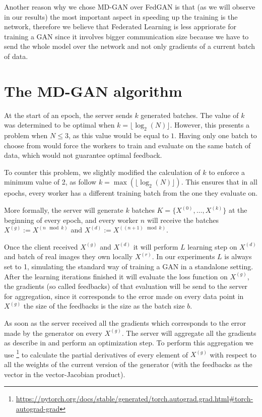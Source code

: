 Another reason why we chose MD-GAN over FedGAN is that (as we will observe in our results) the most important aspect in speeding up the training is the network, therefore we believe that  Federated Learning is less appriorate for training a GAN since it involves bigger communication size because we have to send the whole model over the network and not only gradients of a current batch of data.

\section{The MD-GAN algorithm}
At the start of an epoch, the server sends $k$ generated batches. The value of $k$ was determined to be optimal when $k = \lfloor \log_2(N) \rfloor$. However, this presents a problem when $N \leq 3$, as this value would be equal to $1$. Having only one batch to choose from would force the workers to train and evaluate on the same batch of data, which would not guarantee optimal feedback.

To counter this problem, we slightly modified the calculation of $k$ to enforce a minimum value of 2, as follow $k = \max(\lfloor \log_2(N) \rfloor)$. This ensures that in all epochs, every worker has a different training batch from the one they evaluate on.

More formally, the server will generate $k$ batches $K = \{X^{(0)}, \dots, X^{(k)}\}$ at the beginning of every epoch, and every worker $n$ will receive the batches $X^{(g)} := X^{(n \mod k)}$ and $X^{(d)} := X^{((n+1) \mod k)}$.

Once the client received $X^{(g)}$ and $X^{(d)}$ it will perform $L$ learning step on $X^{(d)}$ and batch of real images they own locally $X^{(r)}$. In our experiments $L$ is always set to 1, simulating the standard way of training a GAN in a standalone setting. After the learning iterations finished it will evaluate the loss function on $X^{(g)}$, the gradients (so called feedbacks) of that evaluation will be send to the server for aggregation, since it corresponds to the error made on every data point in $X^{(g)}$ the size of the feedbacks is the size as the batch size $b$.


As soon as the server received all the gradients which corresponds to the error made by the generator on every $X^{(g)}$. The server will aggregate all the gradients as describe in \cite{mdgan} and perform an optimization step. To perform this aggregation we use \footnote{\url{https://pytorch.org/docs/stable/generated/torch.autograd.grad.html\#torch-autograd-grad}} to calculate the partial derivatives of every element of $X^{(g)}$ with respect to all the weights of the current version of the generator (with the feedbacks as the vector in the vector-Jacobian product).

